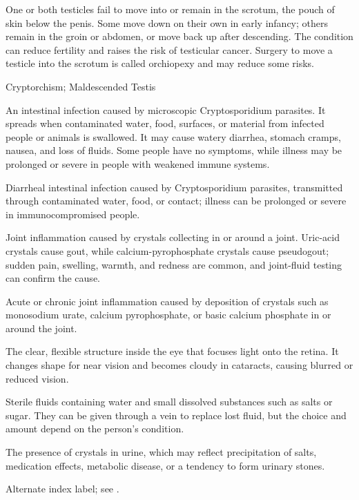  One or both testicles fail to move into or remain in the scrotum, the pouch of skin below the penis. Some move down on their own in early infancy; others remain in the groin or abdomen, or move back up after descending. The condition can reduce fertility and raises the risk of testicular cancer. Surgery to move a testicle into the scrotum is called orchiopexy and may reduce some risks.

\synonyms
Cryptorchism; Maldescended Testis

 An intestinal infection caused by microscopic Cryptosporidium parasites. It spreads when contaminated water, food, surfaces, or material from infected people or animals is swallowed. It may cause watery diarrhea, stomach cramps, nausea, and loss of fluids. Some people have no symptoms, while illness may be prolonged or severe in people with weakened immune systems.

 Diarrheal intestinal infection caused by Cryptosporidium parasites, transmitted through contaminated water, food, or contact; illness can be prolonged or severe in immunocompromised people.

 Joint inflammation caused by crystals collecting in or around a joint. Uric-acid crystals cause gout, while calcium-pyrophosphate crystals cause pseudogout; sudden pain, swelling, warmth, and redness are common, and joint-fluid testing can confirm the cause.

 Acute or chronic joint inflammation caused by deposition of crystals such as monosodium urate, calcium pyrophosphate, or basic calcium phosphate in or around the joint.

 The clear, flexible structure inside the eye that focuses light onto the retina. It changes shape for near vision and becomes cloudy in cataracts, causing blurred or reduced vision.

 Sterile fluids containing water and small dissolved substances such as salts or sugar. They can be given through a vein to replace lost fluid, but the choice and amount depend on the person's condition.

 The presence of crystals in urine, which may reflect precipitation of salts, medication
effects, metabolic disease, or a tendency to form urinary stones.

 Alternate index label; see .

